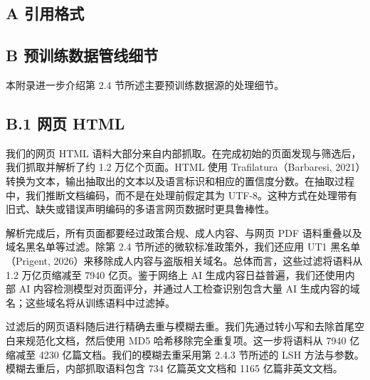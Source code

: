 \subsection{A 引用格式}\label{a-citation-reference}

\begin{Shaded}
\begin{Highlighting}[]
\NormalTok{\{}\NormalTok{,}
\NormalTok{\}}
\end{Highlighting}
\end{Shaded}

\subsection{B 预训练数据管线细节}\label{b-pretraining-data-pipeline-details}

本附录进一步介绍第 2.4 节所述主要预训练数据源的处理细节。

\subsection{B.1 网页 HTML}\label{b.1-web-html}

我们的网页 HTML 语料大部分来自内部抓取。在完成初始的页面发现与筛选后，我们抓取并解析了约 1.2 万亿个页面。HTML 使用 Trafilatura（Barbaresi, 2021）转换为文本，输出抽取出的文本以及语言标识和相应的置信度分数。在抽取过程中，我们推断文档编码，而不是在处理前假定其为 UTF-8。这种方式在处理带有旧式、缺失或错误声明编码的多语言网页数据时更具鲁棒性。

解析完成后，所有页面都要经过政策合规、成人内容、与网页 PDF 语料重叠以及域名黑名单等过滤。除第 2.4 节所述的微软标准政策外，我们还应用 UT1 黑名单（Prigent, 2026）来移除成人内容与盗版相关域名。总体而言，这些过滤将语料从 1.2 万亿页缩减至 7940 亿页。鉴于网络上 AI 生成内容日益普遍，我们还使用内部 AI 内容检测模型对页面评分，并通过人工检查识别包含大量 AI 生成内容的域名；这些域名将从训练语料中过滤掉。

过滤后的网页语料随后进行精确去重与模糊去重。我们先通过转小写和去除首尾空白来规范化文档，然后使用 MD5 哈希移除完全重复项。这一步将语料从 7940 亿缩减至 4230 亿篇文档。我们的模糊去重采用第 2.4.3 节所述的 LSH 方法与参数。模糊去重后，内部抓取语料包含 734 亿篇英文文档和 1165 亿篇非英文文档。

